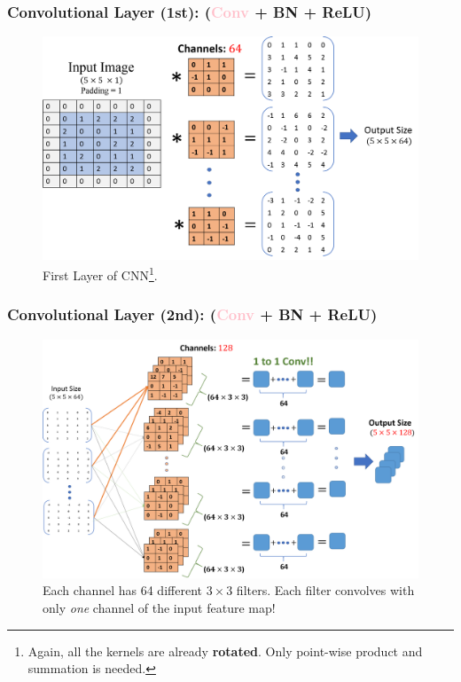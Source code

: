 \documentclass[10pt]{beamer}
\begin{document}
\begin{frame}
	\frametitle{Convolutional Layer (1st): (\textcolor{pink}{\textbf{Conv}} + BN + ReLU)}
	\begin{figure}[H]
	\centerline{
		\includegraphics[width=1.0\textwidth]{convolution_1st_layer.png}
	}
	\caption{First Layer of CNN\footnote{Again, all the kernels are already \textbf{rotated}. Only point-wise product and summation is needed.}.}
	\end{figure}		
\vskip -0.2in
\end{frame}

\begin{frame}
\frametitle{Convolutional Layer (2nd): (\textcolor{pink}{\textbf{Conv}} + BN + ReLU)}
	\begin{figure}[H]
		\centerline{
			\includegraphics[width=1.0\textwidth]{convolution_2nd_layer2.png}
		}
	\caption{Each channel has 64 different $3\times 3$ filters. Each filter convolves with only \textit{one} channel of the input feature map!}
	\end{figure}
\end{frame}
\end{document}
